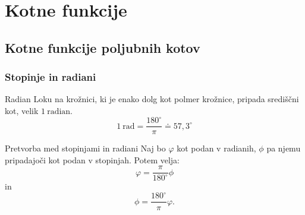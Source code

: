 \section{Kotne funkcije}

\begin{frame}
    \sectionpage
\end{frame}

\begin{frame}
\end{frame}

    \subsection{Kotne funkcije poljubnih kotov}

        \begin{frame}
            \frametitle{Stopinje in radiani}

            \begin{alertblock}{Radian}
                Loku na krožnici, ki je enako dolg kot polmer krožnice, pripada središčni kot, velik $1 \ \textrm{radian}$.
                $$ 1 \ \textrm{rad}=\frac{180^\circ}{\pi}\doteq 57,3^\circ$$
            \end{alertblock}

            \begin{exampleblock}{Pretvorba med stopinjami in radiani}
                Naj bo $\varphi$ kot podan v radianih, $\phi$ pa njemu pripadajoči kot podan v stopinjah. Potem velja:
                $$ \varphi = \frac{\pi}{180^\circ}\phi$$
                in 
                $$ \phi = \frac{180^\circ}{\pi} \varphi.$$
            \end{exampleblock}
        \end{frame}

